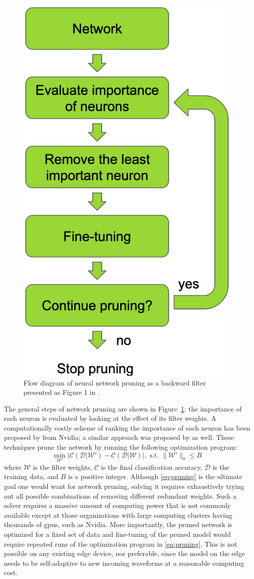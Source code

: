 \documentclass{article}
\begin{document}
%
\begin{figure}
    \centering
    \includegraphics[width=0.32\linewidth]{pruning}
    \caption{Flow diagram of neural network pruning as a backward filter presented as Figure 1 in  \textcite{molchanov2016pruning}.}
    \label{fig:pruning}
\end{figure}
%
The general steps of network pruning \autocite{li2016pruning} are shown in Figure~\ref{fig:pruning}: the importance of each neuron is evaluated by looking at the effect of its filter weights.
A computationally costly scheme of ranking the importance of each neuron has been proposed by \textcite{molchanov2016pruning} from Nvidia; a similar approach was proposed by \textcite{anwar2017structured} as well.
These techniques prune the network by running the following optimization program:
%
\begin{equation}
\min_{\mathcal{W}'} \left|\mathcal{C} (\mathcal{D} | \mathcal{W}') - \mathcal{C} (\mathcal{D} | \mathcal{W})\right|, \text{ s.t. } \| \mathcal{W}' \|_0 \leq B
\label{eq:pruning}
\end{equation}
%
where $\mathcal{W}$ is the filter weights, $\mathcal{C}$ is the final classification accuracy, $\mathcal{D}$ is the training data, and $B$ is a positive integer.
Although \eqref{eq:pruning} is the ultimate goal one would want for network pruning, solving it requires exhaustively trying out all possible combinations of removing different redundant weights.
Such a solver requires a massive amount of computing power that is not commonly available except at those organizations with large computing clusters having thousands of \glspl{gpu}, such as Nvidia.
More importantly, the pruned network is optimized for a fixed set of data and fine-tuning of the pruned model would require repeated runs of the optimization program in \eqref{eq:pruning}.
This is not possible on any existing edge device, nor preferable, since the model on the edge needs to be self-adaptive to new incoming waveforms at a reasonable computing cost.
\end{document}
